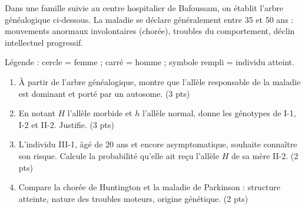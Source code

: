 \documentclass[11pt]{article}
\begin{document}
\begin{exercice}
Dans une famille suivie au centre hospitalier de Bafoussam, on établit l'arbre généalogique ci-dessous. La maladie se déclare généralement entre 35 et 50 ans : mouvements anormaux involontaires (chorée), troubles du comportement, déclin intellectuel progressif.

\begin{center}
\end{center}

Légende : cercle = femme ; carré = homme ; symbole rempli = individu atteint.

\begin{enumerate}
\item À partir de l'arbre généalogique, montre que l'allèle responsable de la maladie est dominant et porté par un autosome. (3 pts)
\item En notant $H$ l'allèle morbide et $h$ l'allèle normal, donne les génotypes de I-1, I-2 et II-2. Justifie. (3 pts)
\item L'individu III-1, âgé de 20 ans et encore asymptomatique, souhaite connaître son risque. Calcule la probabilité qu'elle ait reçu l'allèle $H$ de sa mère II-2. (2 pts)
\item Compare la chorée de Huntington et la maladie de Parkinson : structure atteinte, nature des troubles moteurs, origine génétique. (2 pts)
\end{enumerate}
\end{exercice}
\end{document}
